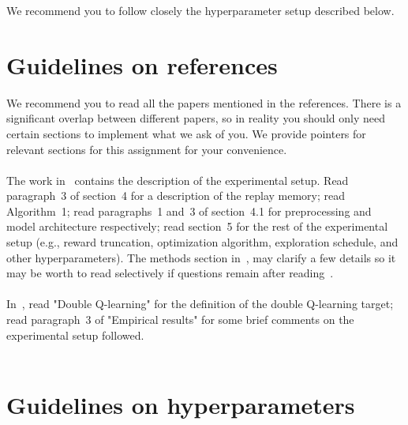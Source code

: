 \documentclass[12pt]{article}
\begin{document}
We recommend you to follow closely the hyperparameter setup described below.

\section*{Guidelines on references}
We recommend you to read all the papers mentioned in the references. There is a significant overlap between different papers, so in reality you should only need certain sections to implement what we ask of you. We provide pointers for relevant sections for this assignment for your convenience. \\ \\
The work in~\cite{mnih2013playing} contains the description of the experimental setup. Read paragraph~3 of section~4 for a description of the replay memory; read Algorithm~1; read  paragraphs~1 and~3 of section~4.1 for preprocessing and model architecture respectively; read section~5 for the rest of the experimental setup (e.g., reward truncation, optimization algorithm, exploration schedule, and other hyperparameters). The methods section in~\cite{mnih2015human}, may clarify a few details so it may be worth to read selectively if questions remain after reading~\cite{mnih2013playing}. \\ \\
In~\cite{van2016deep}, read "Double Q-learning"  for the definition of the double Q-learning target; read paragraph~3 of "Empirical results" for some brief comments on the experimental setup followed. \\ \\

\section*{Guidelines on hyperparameters}
\end{document}
